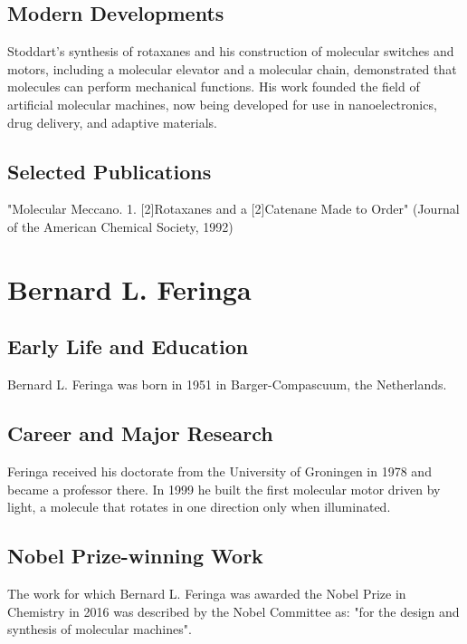 \subsection*{Modern Developments}

Stoddart's synthesis of rotaxanes and his construction of molecular switches and motors, including a molecular elevator and a molecular chain, demonstrated that molecules can perform mechanical functions. His work founded the field of artificial molecular machines, now being developed for use in nanoelectronics, drug delivery, and adaptive materials.

\subsection*{Selected Publications}

"Molecular Meccano. 1. [2]Rotaxanes and a [2]Catenane Made to Order" (Journal of the American Chemical Society, 1992)

\clearpage

\section{Bernard L. Feringa}

\subsection*{Early Life and Education}

Bernard L. Feringa was born in 1951 in Barger-Compascuum, the Netherlands.

\subsection*{Career and Major Research}

Feringa received his doctorate from the University of Groningen in 1978 and became a professor there. In 1999 he built the first molecular motor driven by light, a molecule that rotates in one direction only when illuminated.

\subsection*{Nobel Prize-winning Work}

The work for which Bernard L. Feringa was awarded the Nobel Prize in Chemistry in 2016 was described by the Nobel Committee as: "for the design and synthesis of molecular machines".

